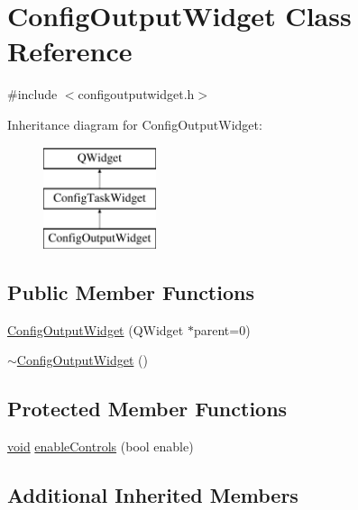 \hypertarget{class_config_output_widget}{\section{Config\-Output\-Widget Class Reference}
\label{class_config_output_widget}
}


{\ttfamily \#include $<$configoutputwidget.\-h$>$}

Inheritance diagram for Config\-Output\-Widget\-:\begin{figure}[H]
\begin{center}
\leavevmode
\includegraphics[height=3.000000cm]{class_config_output_widget}
\end{center}
\end{figure}
\subsection*{Public Member Functions}
\begin{DoxyCompactItemize}
\item 
\hyperlink{group___config_plugin_gae97fadc2217af00fbdcd40904dffdfcd}{Config\-Output\-Widget} (Q\-Widget $\ast$parent=0)
\item 
\hyperlink{group___config_plugin_ga583ddecf4689ec9d73a39ac36d47beb5}{$\sim$\-Config\-Output\-Widget} ()
\end{DoxyCompactItemize}
\subsection*{Protected Member Functions}
\begin{DoxyCompactItemize}
\item 
\hyperlink{group___u_a_v_objects_plugin_ga444cf2ff3f0ecbe028adce838d373f5c}{void} \hyperlink{group___config_plugin_ga8c6d4684111bd4a10d4940a803faf852}{enable\-Controls} (bool enable)
\end{DoxyCompactItemize}
\subsection*{Additional Inherited Members}


